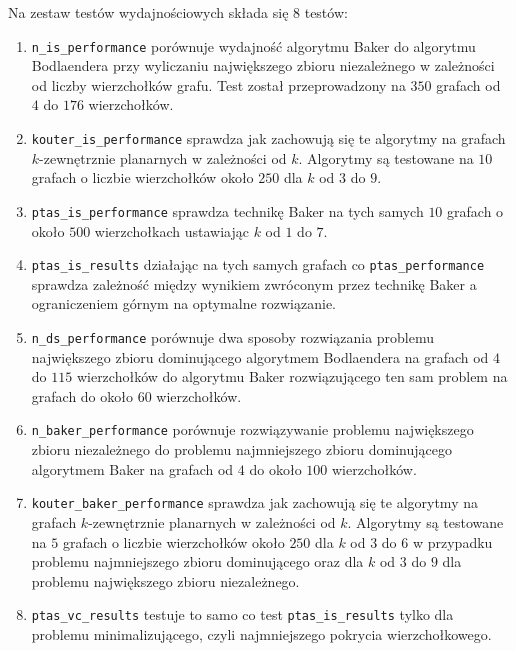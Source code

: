 \documentclass[twoside,a4paper,12pt]{report} %
\theoremstyle{break}
\begin{document}
Na zestaw testów wydajnościowych składa się 8 testów:
\begin{enumerate}
\item \texttt{n\_is\_performance} porównuje wydajność algorytmu Baker do algorytmu Bodlaendera przy wyliczaniu największego zbioru niezależnego w zależności od liczby wierzchołków grafu. Test został przeprowadzony na $350$ grafach od $4$ do $176$ wierzchołków.

\item \texttt{kouter\_is\_performance} sprawdza jak zachowują się te algorytmy na grafach $k$-zewnętrznie planarnych w zależności od $k$. Algorytmy są testowane na $10$ grafach o liczbie wierzchołków około $250$ dla $k$ od $3$ do $9$.

\item \texttt{ptas\_is\_performance} sprawdza technikę Baker na tych samych $10$ grafach o około $500$ wierzchołkach ustawiając $k$ od $1$ do $7$.

\item \texttt{ptas\_is\_results} działając na tych samych grafach co \texttt{ptas\_performance} sprawdza zależność między wynikiem zwróconym przez technikę Baker a ograniczeniem górnym na optymalne rozwiązanie.

\item \texttt{n\_ds\_performance} porównuje dwa sposoby rozwiązania problemu największego zbioru dominującego algorytmem Bodlaendera na grafach od $4$ do $115$ wierzchołków do algorytmu Baker rozwiązującego ten sam problem na grafach do około $60$ wierzchołków.

\item \texttt{n\_baker\_performance} porównuje rozwiązywanie problemu największego zbioru niezależnego do problemu najmniejszego zbioru dominującego algorytmem Baker na grafach od $4$ do około $100$ wierzchołków.

\item \texttt{kouter\_baker\_performance} sprawdza jak zachowują się te algorytmy na grafach $k$-zewnętrznie planarnych w zależności od $k$. Algorytmy są testowane na $5$ grafach o liczbie wierzchołków około $250$ dla $k$ od $3$ do $6$ w przypadku problemu najmniejszego zbioru dominującego oraz dla $k$ od $3$ do $9$ dla problemu największego zbioru niezależnego.

\item \texttt{ptas\_vc\_results} testuje to samo co test \texttt{ptas\_is\_results} tylko dla problemu minimalizującego, czyli najmniejszego pokrycia wierzchołkowego.

\end{enumerate}
\end{document}
